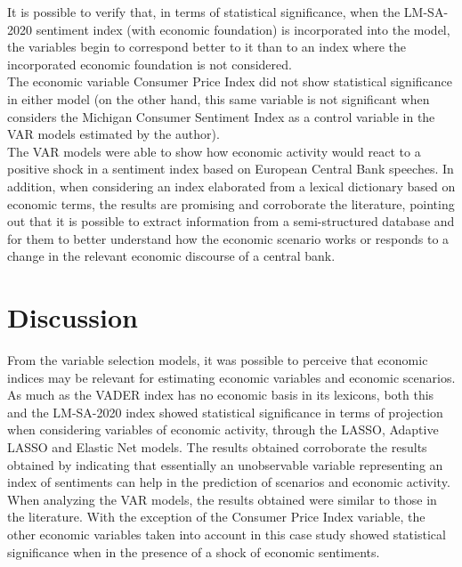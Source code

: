 It is possible to verify that, in terms of statistical significance, when the LM-SA-2020 sentiment index (with economic foundation) is incorporated into the model, the variables begin to correspond better to it than to an index where the incorporated economic foundation is not considered.\\

The economic variable Consumer Price Index did not show statistical significance in either model (on the other hand, this same variable is not significant when \cite[p.46]{shapiro2020measuring} considers the Michigan Consumer Sentiment Index as a control variable in the VAR models estimated by the author).\\

The VAR models were able to show how economic activity would react to a positive shock in a sentiment index based on European Central Bank speeches. In addition, when considering an index elaborated from a lexical dictionary based on economic terms, the results are promising and corroborate the literature, pointing out that it is possible to extract information from a semi-structured database and for them to better understand how the economic scenario works or responds to a change in the relevant economic discourse of a central bank.\\

\section{Discussion}

From the variable selection models, it was possible to perceive that economic indices may be relevant for estimating economic variables and economic scenarios. \\

As much as the VADER index has no economic basis in its lexicons, both this and the LM-SA-2020 index showed statistical significance in terms of projection when considering variables of economic activity, through the LASSO, Adaptive LASSO and Elastic Net models. The results obtained corroborate the results obtained by \cite{shapiro2020measuring} indicating that essentially an unobservable variable representing an index of sentiments can help in the prediction of scenarios and economic activity.\\

When analyzing the VAR models, the results obtained were similar to those in the literature. With the exception of the Consumer Price Index variable, the other economic variables taken into account in this case study showed statistical significance when in the presence of a shock of economic sentiments.\\

